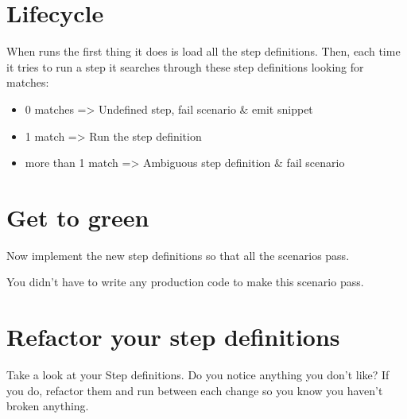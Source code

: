     \section*{\CUKE{} Lifecycle}
    
    When \CUKE{} runs the first thing it does is load all the step definitions. Then, each time it tries to run a step it searches through these step definitions looking for matches:
    \begin{itemize}
        \item 0 matches => Undefined step, fail scenario \& emit snippet
        \item 1 match => Run the step definition
        \item more than 1 match => Ambiguous step definition \& fail scenario
    \end{itemize}
    
    \section*{Get to green}
    
    Now implement the new step definitions so that all the scenarios pass.
    
    You didn't have to write any production code to make this scenario pass.
    
    
    \section*{Refactor your step definitions}
    
    Take a look at your Step definitions. Do you notice anything you don't like? If you do, refactor them
    and run \CUKE{} between each change so you know you haven't broken anything.
\fi    